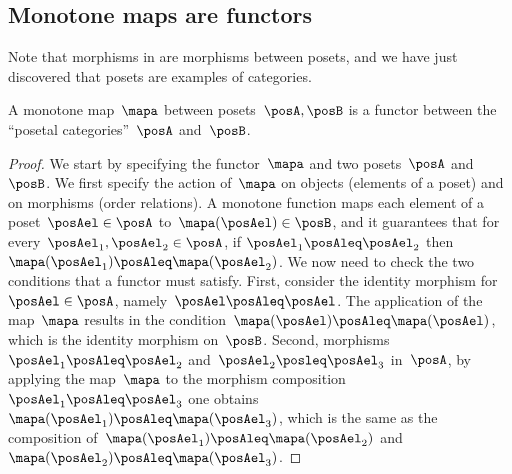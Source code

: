 \subsection{Monotone maps are functors}
Note that morphisms in \Pos are morphisms between posets, and we have just discovered that posets are examples of categories.
\begin{lemma}
  \label{lem:posetfunctor}
  A monotone map~$\mapa$ between posets~$\posA,\posB$ is a functor between the ``posetal categories''~$\posA$ and~$\posB$.
\end{lemma}
\begin{proof}
  We start by specifying the functor~$\mapa$ and two posets~$\posA$ and~$\posB$. We first specify the action of~$\mapa$ on objects (elements of a poset) and on morphisms (order relations). A monotone function maps each element of a poset~$\posAel\in \posA$ to~$\mapa(\posAel) \in \posB$, and it guarantees that for every~$\posAel_1,\posAel_2\in \posA$, if $\posAel_1\posAleq \posAel_2$ then~$\mapa(\posAel_1)\posAleq \mapa(\posAel_2)$. We now need to check the two conditions that a functor must satisfy. First, consider the identity morphism for~$\posAel\in \posA$, namely~$\posAel \posAleq \posAel$. The application of the map~$\mapa$ results in the condition~$\mapa(\posAel)\posAleq \mapa(\posAel)$, which is the identity morphism on~$\posB$. Second, morphisms~$\posAel_1\posAleq \posAel_2$ and~$\posAel_2\posleq \posAel_3$ in~$\posA$, by applying the map~$\mapa$ to the morphism composition~$\posAel_1\posAleq \posAel_3$ one obtains~$\mapa(\posAel_1)\posAleq \mapa(\posAel_3)$, which is the same as the composition of~$\mapa(\posAel_1)\posAleq \mapa(\posAel_2)$ and~$\mapa(\posAel_2)\posAleq \mapa(\posAel_3)$.
\end{proof}

\devel{} %
